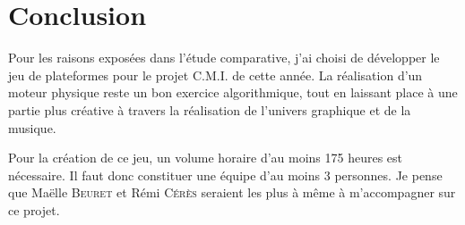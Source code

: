 \chapter*{Conclusion}

Pour les raisons exposées dans l'étude comparative,
j'ai choisi de développer le jeu de plateformes pour le projet
C.M.I. de cette année. La réalisation d'un moteur physique
reste un bon exercice algorithmique, tout en laissant place
à une partie plus créative à travers la réalisation de l'univers
graphique et de la musique.

Pour la création de ce jeu, un volume horaire d'au moins
175 heures est nécessaire. Il faut donc constituer une
équipe d'au moins 3 personnes. Je pense que
Maëlle \textsc{Beuret} et Rémi \textsc{Cérès} seraient
les plus à même à m'accompagner sur ce projet.

